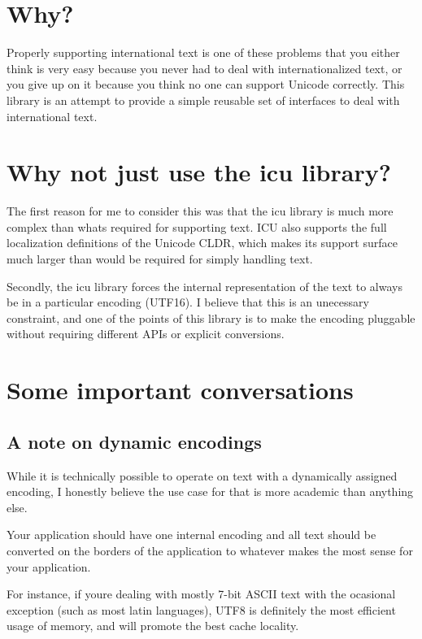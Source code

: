 \section*{Why?}

Properly supporting international text is one of these problems that you either think is very easy because you never had to deal with internationalized text, or you give up on it because you think no one can support Unicode correctly. This library is an attempt to provide a simple reusable set of interfaces to deal with international text.

\section*{Why not just use the icu library?}

The first reason for me to consider this was that the icu library is much more complex than what\textquotesingle{}s required for supporting text. I\+CU also supports the full localization definitions of the Unicode C\+L\+DR, which makes its support surface much larger than would be required for simply handling text.

Secondly, the icu library forces the internal representation of the text to always be in a particular encoding (U\+T\+F16). I believe that this is an unecessary constraint, and one of the points of this library is to make the encoding pluggable without requiring different A\+P\+Is or explicit conversions.

\section*{Some important conversations}

\subsection*{A note on dynamic encodings}

While it is technically possible to operate on text with a dynamically assigned encoding, I honestly believe the use case for that is more academic than anything else.

Your application should have one internal encoding and all text should be converted on the borders of the application to whatever makes the most sense for your application.

For instance, if you\textquotesingle{}re dealing with mostly 7-\/bit A\+S\+C\+II text with the ocasional exception (such as most latin languages), U\+T\+F8 is definitely the most efficient usage of memory, and will promote the best cache locality.

